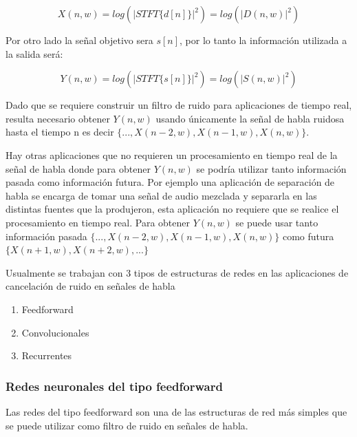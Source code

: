 \begin{equation*}
	X(n, w) = log(|STFT\{d[n]\}|^2) = log(|D(n, w)|^2)
\end{equation*}

Por otro lado la señal objetivo sera $s[n]$, por lo tanto la información utilizada a la salida será:

\begin{equation*}
	Y(n, w) = log(|STFT\{s[n]\}|^2) = log(|S(n, w)|^2)
\end{equation*}

Dado que se requiere construir un filtro de ruido para aplicaciones de tiempo real, resulta necesario obtener $Y(n, w)$ usando únicamente la señal de habla ruidosa hasta el tiempo n es decir $\{..., X(n - 2, w), X(n - 1, w), X(n, w)\}$. 

Hay otras aplicaciones que no requieren un procesamiento en tiempo real de la señal de habla donde para obtener $Y(n, w)$ se podría utilizar tanto información pasada como información futura. Por ejemplo una aplicación de separación de habla se encarga de tomar una señal de audio mezclada y separarla en las distintas fuentes que la produjeron, esta aplicación no requiere que se realice el procesamiento en tiempo real. Para obtener $Y(n, w)$ se puede usar tanto información pasada $\{..., X(n - 2, w), X(n - 1, w), X(n, w)\}$ como futura $\{X(n +1, w), X(n + 2, w), ...\}$ 

Usualmente se trabajan con 3 tipos de estructuras de redes en las aplicaciones de cancelación de ruido en señales de habla \cite{a_regression_approach_to_speech_enhancement_based_on_deep_neural_networks,a_fully_convolutional_neural_network_for_speech_enhancement,a_convolutional_recurrent_neural_network_for_real_time_speech_enhancement}

\begin{enumerate}
	\item Feedforward
	\item Convolucionales
	\item Recurrentes
\end{enumerate}

\subsubsection{Redes neuronales del tipo feedforward}

Las redes del tipo feedforward \cite{deep_learning} son una de las estructuras de red más simples que se puede utilizar como filtro de ruido en señales de habla. 

